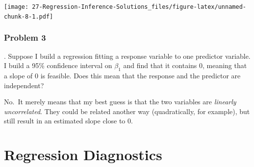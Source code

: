 \documentclass[
]{book}
\newenvironment{Shaded}{\begin{snugshade}}{\end{snugshade}}
\newcommand{\DataTypeTok}[1]{\textcolor[rgb]{0.13,0.29,0.53}{#1}}
\newcommand{\DecValTok}[1]{\textcolor[rgb]{0.00,0.00,0.81}{#1}}
\newcommand{\KeywordTok}[1]{\textcolor[rgb]{0.13,0.29,0.53}{\textbf{#1}}}
\newcommand{\NormalTok}[1]{#1}
\newcommand{\OperatorTok}[1]{\textcolor[rgb]{0.81,0.36,0.00}{\textbf{#1}}}
\newcommand{\StringTok}[1]{\textcolor[rgb]{0.31,0.60,0.02}{#1}}
\begin{document}
\begin{Shaded}
\end{Shaded}

\texttt{[image: 27-Regression-Inference-Solutions\_files/figure-latex/unnamed-chunk-8-1.pdf]}

\hypertarget{problem-3-18}{%
\subsection{Problem 3}\label{problem-3-18}}

. Suppose I build a regression fitting a response variable to one predictor variable. I build a 95\% confidence interval on \(\beta_1\) and find that it contains 0, meaning that a slope of 0 is feasible. Does this mean that the response and the predictor are independent?

No.~It merely means that my best guess is that the two variables are \emph{linearly uncorrelated}. They could be related another way (quadratically, for example), but still result in an estimated slope close to 0.

\hypertarget{LRDIAG}{%
\chapter{Regression Diagnostics}\label{LRDIAG}}
\end{document}
